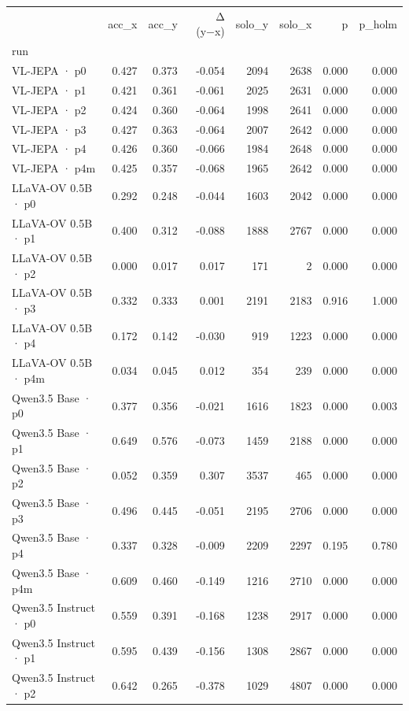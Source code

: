 \begin{tabular}{lrrrrrrr}
\toprule
 & acc\_x & acc\_y & Δ (y−x) & solo\_y & solo\_x & p & p\_holm \\
run &  &  &  &  &  &  &  \\
\midrule
VL-JEPA · p0 & 0.427 & 0.373 & -0.054 & 2094 & 2638 & 0.000 & 0.000 \\
VL-JEPA · p1 & 0.421 & 0.361 & -0.061 & 2025 & 2631 & 0.000 & 0.000 \\
VL-JEPA · p2 & 0.424 & 0.360 & -0.064 & 1998 & 2641 & 0.000 & 0.000 \\
VL-JEPA · p3 & 0.427 & 0.363 & -0.064 & 2007 & 2642 & 0.000 & 0.000 \\
VL-JEPA · p4 & 0.426 & 0.360 & -0.066 & 1984 & 2648 & 0.000 & 0.000 \\
VL-JEPA · p4m & 0.425 & 0.357 & -0.068 & 1965 & 2642 & 0.000 & 0.000 \\
LLaVA-OV 0.5B · p0 & 0.292 & 0.248 & -0.044 & 1603 & 2042 & 0.000 & 0.000 \\
LLaVA-OV 0.5B · p1 & 0.400 & 0.312 & -0.088 & 1888 & 2767 & 0.000 & 0.000 \\
LLaVA-OV 0.5B · p2 & 0.000 & 0.017 & 0.017 & 171 & 2 & 0.000 & 0.000 \\
LLaVA-OV 0.5B · p3 & 0.332 & 0.333 & 0.001 & 2191 & 2183 & 0.916 & 1.000 \\
LLaVA-OV 0.5B · p4 & 0.172 & 0.142 & -0.030 & 919 & 1223 & 0.000 & 0.000 \\
LLaVA-OV 0.5B · p4m & 0.034 & 0.045 & 0.012 & 354 & 239 & 0.000 & 0.000 \\
Qwen3.5 Base · p0 & 0.377 & 0.356 & -0.021 & 1616 & 1823 & 0.000 & 0.003 \\
Qwen3.5 Base · p1 & 0.649 & 0.576 & -0.073 & 1459 & 2188 & 0.000 & 0.000 \\
Qwen3.5 Base · p2 & 0.052 & 0.359 & 0.307 & 3537 & 465 & 0.000 & 0.000 \\
Qwen3.5 Base · p3 & 0.496 & 0.445 & -0.051 & 2195 & 2706 & 0.000 & 0.000 \\
Qwen3.5 Base · p4 & 0.337 & 0.328 & -0.009 & 2209 & 2297 & 0.195 & 0.780 \\
Qwen3.5 Base · p4m & 0.609 & 0.460 & -0.149 & 1216 & 2710 & 0.000 & 0.000 \\
Qwen3.5 Instruct · p0 & 0.559 & 0.391 & -0.168 & 1238 & 2917 & 0.000 & 0.000 \\
Qwen3.5 Instruct · p1 & 0.595 & 0.439 & -0.156 & 1308 & 2867 & 0.000 & 0.000 \\
Qwen3.5 Instruct · p2 & 0.642 & 0.265 & -0.378 & 1029 & 4807 & 0.000 & 0.000 \\

\end{tabular}
